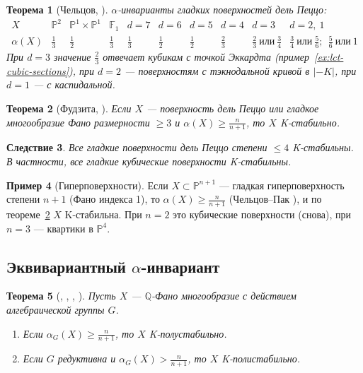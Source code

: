 \documentclass[11pt,a4paper]{article}
\theoremstyle{plain}
\newtheorem{theorem}{Теорема}[section]
\newtheorem{corollary}[theorem]{Следствие}
\theoremstyle{definition}
\newtheorem{example}[theorem]{Пример}
\theoremstyle{remark}
\newcommand{\Q}{\mathbb{Q}}
\newcommand{\PP}{\mathbb{P}}
\begin{document}
\begin{theorem}[{Чельцов, \cite{Che08}}]\label{thm:Cheltsov}
$\alpha$-инварианты гладких поверхностей дель Пеццо:
\[
\begin{array}{c|c|c|c|c|c|c|c|c|c}
X & \PP^2 & \PP^1\times\PP^1 & \mathbb F_1 & d=7 & d=6 & d=5 & d=4 & d=3 & d=2,\ 1\\\hline
\alpha(X) & \frac13 & \frac12 & \frac13 & \frac13 & \frac12 & \frac12 & \frac23 &
\frac23\ \text{или}\ \frac34 & \frac34\ \text{или}\ \frac56;\ \ \frac56\ \text{или}\ 1
\end{array}
\]
При $d=3$ значение $\frac23$ отвечает кубикам с точкой Эккардта (пример~\ref{ex:lct-cubic-sections}),
при $d=2$ --- поверхностям с тэкнодальной кривой в $|-K|$, при $d=1$ --- с каспидальной.
\end{theorem}

\begin{theorem}[{Фудзита, \cite{Fuj19a}}]\label{thm:Fujita-alpha}
Если $X$ --- поверхность дель Пеццо или гладкое многообразие Фано размерности $\ge3$ и
$\alpha(X)\ge\frac n{n+1}$, то $X$ K-стабильно.
\end{theorem}

\begin{corollary}\label{cor:dP-le4}
Все гладкие поверхности дель Пеццо степени $\le4$ K-стабильны. В частности, \emph{все гладкие
кубические поверхности K-стабильны}.
\end{corollary}

\begin{example}[Гиперповерхности]
Если $X\subset\PP^{n+1}$ --- гладкая гиперповерхность степени $n+1$ (Фано индекса 1), то
$\alpha(X)\ge\frac n{n+1}$ (Чельцов--Пак \cite{CP02}), и по теореме~\ref{thm:Fujita-alpha} $X$
K-стабильна. При $n=2$ это кубические поверхности (снова), при $n=3$ --- квартики в $\PP^4$.
\end{example}

\subsection{Эквивариантный $\alpha$-инвариант}

\begin{theorem}[{\cite{DS16}, \cite{LX20}, \cite{LZ22}, \cite{Zhu21}}]\label{thm:alphaG}
Пусть $X$ --- $\Q$-Фано многообразие с действием алгебраической группы $G$.
\begin{enumerate}
\item Если $\alpha_G(X)\ge\frac n{n+1}$, то $X$ K-полустабильно.
\item Если $G$ редуктивна и $\alpha_G(X)>\frac n{n+1}$, то $X$ K-полистабильно.
\end{enumerate}
\end{theorem}
\end{document}
